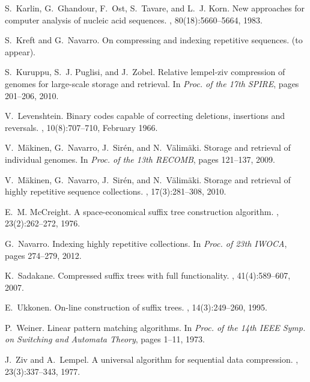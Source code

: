 \documentclass{llncs}
\begin{document}
\begin{thebibliography}{10}
S.~Karlin, G.~Ghandour, F.~Ost, S.~Tavare, and L.~J. Korn.
\newblock New approaches for computer analysis of nucleic acid sequences.
, 80(18):5660--5664, 1983.

S.~Kreft and G.~Navarro.
\newblock On compressing and indexing repetitive sequences.
 (to appear).

S.~Kuruppu, S.~J. Puglisi, and J.~Zobel.
\newblock Relative lempel-ziv compression of genomes for large-scale storage
  and retrieval.
\newblock In {\em Proc. of the 17th SPIRE}, pages 201--206, 2010.

V.~Levenshtein.
\newblock Binary codes capable of correcting deletions, insertions and
  reversals.
, 10(8):707--710, February 1966.

V.~M{\"a}kinen, G.~Navarro, J.~Sir{\'e}n, and N.~V{\"a}lim{\"a}ki.
\newblock Storage and retrieval of individual genomes.
\newblock In {\em Proc. of the 13th RECOMB}, pages 121--137, 2009.

V.~M{\"a}kinen, G.~Navarro, J.~Sir{\'e}n, and N.~V{\"a}lim{\"a}ki.
\newblock Storage and retrieval of highly repetitive sequence collections.
, 17(3):281--308, 2010.

E.~M. McCreight.
\newblock A space-economical suffix tree construction algorithm.
, 23(2):262--272, 1976.

G.~Navarro.
\newblock Indexing highly repetitive collections.
\newblock In {\em Proc. of 23th IWOCA}, pages 274--279, 2012.

K.~Sadakane.
\newblock Compressed suffix trees with full functionality.
, 41(4):589--607, 2007.

E.~Ukkonen.
\newblock On-line construction of suffix trees.
, 14(3):249--260, 1995.

P.~Weiner.
\newblock Linear pattern matching algorithms.
\newblock In {\em Proc. of the 14th IEEE Symp. on Switching and Automata
  Theory}, pages 1--11, 1973.

J.~Ziv and A.~Lempel.
\newblock A universal algorithm for sequential data compression.
, 23(3):337--343, 1977.

\end{thebibliography}
\end{document}
